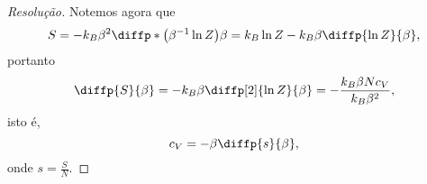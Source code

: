 \begin{proof}[Resolução]
    Notemos agora que
    \begin{equation*}
        S = -k_B \beta^2 \diffp*{\left(\beta^{-1} \ln Z\right)}{\beta} = k_B \ln Z - k_B \beta \diffp{\ln{Z}}{\beta},
    \end{equation*}
    portanto
    \begin{equation*}
        \diffp{S}{\beta} = -k_B \beta \diffp[2]{\ln Z}{\beta} = -\frac{k_B \beta N c_V}{k_B \beta^2},
    \end{equation*}
    isto é,
    \begin{equation*}
        c_V = -\beta \diffp{s}{\beta},
    \end{equation*}
    onde \(s = \frac{S}{N}.\)
\end{proof}
